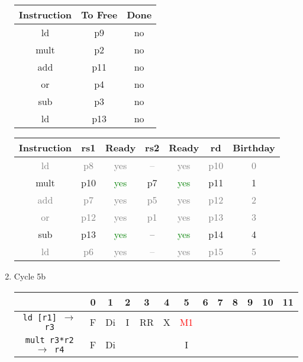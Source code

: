 \documentclass[12pt]{article}
\begin{document}
\begin{enumerate}
\begin{table}[H]
\begin{tabular}{|c|c|c|}
					Instruction & To Free & Done\\
					\hline
					ld & p9 & no\\
					\hline
					mult & p2 & no\\
					\hline
					add & p11 & no\\
					\hline
					or & p4 & no\\
					\hline
					sub & p3 & no\\
					\hline
					ld & p13 & no\\
					\hline
				\end{tabular}
				\hfill
				\begin{tabular}{|c|c|c|c|c|c|c|}
					\hline
					Instruction & rs1 & Ready & rs2 & Ready & rd & Birthday\\
					\hline
					\textcolor{gray}{ld} & \textcolor{gray}{p8} & \textcolor{gray}{yes} & \textcolor{gray}{--} & \textcolor{gray}{yes} & \textcolor{gray}{p10} & \textcolor{gray}{0}\\
					\hline
					mult & p10 & \textcolor{green}{yes} & p7 & \textcolor{green}{yes} & p11 & 1\\
					\hline
					\textcolor{gray}{add} & \textcolor{gray}{p7} & \textcolor{gray}{yes} & \textcolor{gray}{p5} & \textcolor{gray}{yes} & \textcolor{gray}{p12} & \textcolor{gray}{2}\\
					\hline
					\textcolor{gray}{or} & \textcolor{gray}{p12} & \textcolor{gray}{yes} & \textcolor{gray}{p1} & \textcolor{gray}{yes} & \textcolor{gray}{p13} & \textcolor{gray}{3}\\
					\hline
					sub & p13 & \textcolor{green}{yes} & -- & \textcolor{green}{yes} & p14 & 4\\
					\hline
					\textcolor{gray}{ld} & \textcolor{gray}{p6} & \textcolor{gray}{yes} & \textcolor{gray}{--} & \textcolor{gray}{yes} & \textcolor{gray}{p15} & \textcolor{gray}{5}\\
					\hline
				\end{tabular}
			\end{table}
		\item
			Cycle 5b
			\begin{table}[H]
				\begin{tabular}{|c|c|c|c|c|c|c|c|c|c|c|c|c|}
					\hline
					 & 0 & 1 & 2 & 3 & 4 & 5 & 6 & 7 & 8 & 9 & 10 & 11\\
					\hline
					\texttt{ld [r1] $\rightarrow$ r3} & F & Di & I & RR & X & \textcolor{red}{M1} &  &  &  &  &  &\\
					\hline
					\texttt{mult r3*r2 $\rightarrow$ r4} & F & Di &  &  &  & I &  &  &  &  &  &\\

\end{tabular}
\end{table}
\end{enumerate}
\end{document}

